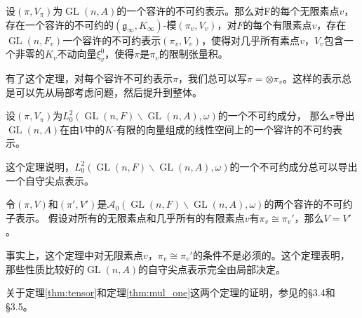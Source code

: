 \begin{theorem}
\label{thm:tensor}
设$(\pi, V_\pi)$为$\operatorname{GL}(n,A)$的一个容许的不可约表示。那么对F的每个无限素点$v$， 存在一个容许的不可约的$(\mathfrak{g}_\infty, K_\infty)$-模$(\pi_v,V_v)$，对$F$的每个有限素点$v$，存在$\operatorname{GL}(n,F_v)$一个容许的不可约表示$(\pi_v,V_v)$，使得对几乎所有素点$v$，$V_v$包含一个非零的$K_v$不动向量$\xi_v^0$，使得$\pi$是$\pi_v$的限制张量积。
\end{theorem}

有了这个定理，对每个容许不可约表示$\pi$，我们总可以写$\pi = \otimes \pi_v$。这样的表示总是可以先从局部考虑问题，然后提升到整体。

\begin{theorem}
设$(\pi, V_\pi)$为$L^2_0\left( \operatorname{GL}(n,F)\backslash \operatorname{GL}(n,A),\omega\right)$的一个不可约成分， 那么$\pi$导出$\operatorname{GL}(n,A)$在由$V$中的$K$-有限的向量组成的线性空间上的一个容许的不可约表示。
\end{theorem}

这个定理说明，$L^2_0\left( \operatorname{GL}(n,F)\backslash \operatorname{GL}(n,A),\omega\right)$的一个不可约成分总可以导出一个自守尖点表示。

\begin{theorem}
\label{thm:mul_one}
令$(\pi, V)$和$(\pi', V')$是$\mathcal{A}_0(\operatorname{GL}(n,F) \backslash \operatorname{GL}(n,A), \omega)$的两个容许的不可约子表示。
假设对所有的无限素点和几乎所有的有限素点$v$有$\pi_v \cong \pi_v'$，那么$V = V'$。
\end{theorem}

事实上，这个定理中对无限素点$v$，$\pi_v \cong \pi_v'$的条件不是必须的。这个定理表明，那些性质比较好的$\operatorname{GL}(n,A)$的自守尖点表示完全由局部决定。

关于定理\ref{thm:tensor}和定理\ref{thm:mul_one}这两个定理的证明，参见的\S3.4和\S3.5。